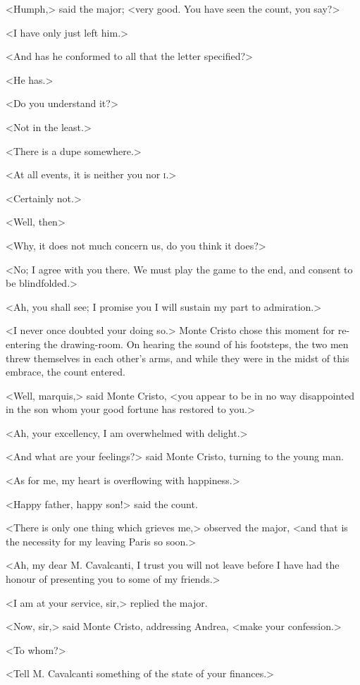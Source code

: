  <Humph,> said the major; <very good. You have seen the count, you say?> 

 <I have only just left him.> 

 <And has he conformed to all that the letter specified?> 

 <He has.> 

 <Do you understand it?> 

 <Not in the least.> 

 <There is a dupe somewhere.> 

 <At all events, it is neither you nor \textsc{i.}> 

 <Certainly not.> 

 <Well, then\longdash> 

 <Why, it does not much concern us, do you think it does?> 

 <No; I agree with you there. We must play the game to the end, and consent to be blindfolded.> 

 <Ah, you shall see; I promise you I will sustain my part to admiration.> 

 <I never once doubted your doing so.> Monte Cristo chose this moment for re-entering the drawing-room. On hearing the sound of his footsteps, the two men threw themselves in each other's arms, and while they were in the midst of this embrace, the count entered. 

 <Well, marquis,> said Monte Cristo, <you appear to be in no way disappointed in the son whom your good fortune has restored to you.> 

 <Ah, your excellency, I am overwhelmed with delight.> 

 <And what are your feelings?> said Monte Cristo, turning to the young man. 

 <As for me, my heart is overflowing with happiness.> 

 <Happy father, happy son!> said the count. 

 <There is only one thing which grieves me,> observed the major, <and that is the necessity for my leaving Paris so soon.> 

 <Ah, my dear M. Cavalcanti, I trust you will not leave before I have had the honour of presenting you to some of my friends.> 

 <I am at your service, sir,> replied the major. 

 <Now, sir,> said Monte Cristo, addressing Andrea, <make your confession.> 

 <To whom?> 

 <Tell M. Cavalcanti something of the state of your finances.> 

